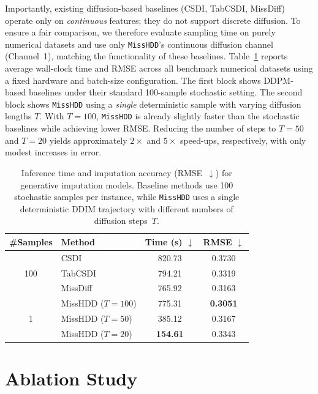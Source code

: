 \documentclass[times, review, 10pt]{elsarticle}
\begin{document}
Importantly, existing diffusion-based baselines (CSDI, TabCSDI, MissDiff)
operate only on \emph{continuous} features; they do not support discrete
diffusion. To ensure a fair comparison, we therefore evaluate sampling time on
purely numerical datasets and use only \texttt{MissHDD}’s continuous diffusion
channel (Channel~1), matching the functionality of these baselines. Table~\ref{tab:inference_summary} reports average wall-clock time and RMSE
across all benchmark numerical datasets using a fixed hardware and batch-size
configuration. The first block shows DDPM-based baselines under their standard
100-sample stochastic setting. The second block shows \texttt{MissHDD} using a
\emph{single} deterministic sample with varying diffusion lengths $T$. With
$T{=}100$, \texttt{MissHDD} is already slightly faster than the stochastic
baselines while achieving lower RMSE. Reducing the number of steps to
$T{=}50$ and $T{=}20$ yields approximately $2{\times}$ and $5{\times}$
speed-ups, respectively, with only modest increases in error.
\begin{table}[!t]
\centering
\caption{
Inference time and imputation accuracy (RMSE~$\downarrow$) for generative
imputation models. Baseline methods use 100 stochastic samples per instance,
while \texttt{MissHDD} uses a single deterministic DDIM trajectory with
different numbers of diffusion steps~$T$.
}
\label{tab:inference_summary}
\begin{tabular}{c|l|c|c}
\hline
\textbf{\#Samples} & \textbf{Method} 
& \textbf{Time (s) $\downarrow$}
& \textbf{RMSE $\downarrow$} \\
\hline
\multirow{3}{*}{100} 
& CSDI      & 820.73 & 0.3730 \\
& TabCSDI   & 794.21 & 0.3319 \\
& MissDiff  & 765.92 & 0.3163 \\
\hline
\multirow{3}{*}{1} 
& MissHDD ($T{=}100$) & 775.31 & \textbf{0.3051} \\
& MissHDD ($T{=}50$)  & 385.12 & 0.3167 \\
& MissHDD ($T{=}20$)  & \textbf{154.61} & 0.3343 \\
\hline
\end{tabular}
\end{table}








\section{Ablation Study}
\end{document}
